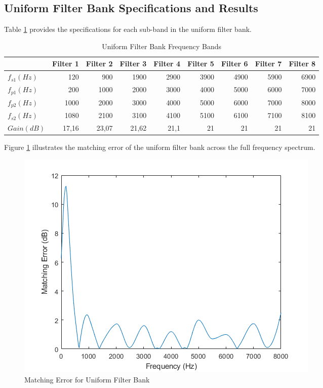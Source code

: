 \documentclass[11pt,onecolumn]{witseiepaper}
\begin{document}
\begin{appendices}
\section{Uniform Filter Bank Specifications and Results}
\label{app:uniFreqBand}

\noindent Table \ref{tab:uniFiltSpec} provides the specifications for each sub-band in the uniform filter bank.

\begin{table}[htbp]
  \centering
  \caption{Uniform Filter Bank Frequency Bands}
  \begin{adjustbox}{width=0.9\linewidth}
    \begin{tabular}{|l|r|r|r|r|r|r|r|r|}
    \hline
          & \multicolumn{1}{l|}{\textbf{Filter 1}} & \multicolumn{1}{l|}{\textbf{Filter 2}} & \multicolumn{1}{l|}{\textbf{Filter 3}} & \multicolumn{1}{l|}{\textbf{Filter 4}} & \multicolumn{1}{l|}{\textbf{Filter 5}} & \multicolumn{1}{l|}{\textbf{Filter 6}} & \multicolumn{1}{l|}{\textbf{Filter 7}} & \multicolumn{1}{l|}{\textbf{Filter 8}} \\
    \hline
    \textbf{$f_{s1} (Hz)$} & 120   & 900   & 1900  & 2900  & 3900  & 4900  & 5900  & 6900 \\
    \hline
    \textbf{$f_{p1} (Hz)$} & 200   & 1000  & 2000  & 3000  & 4000  & 5000  & 6000  & 7000 \\
    \hline
    \textbf{$f_{p2} (Hz)$} & 1000  & 2000  & 3000  & 4000  & 5000  & 6000  & 7000  & 8000 \\
    \hline
    \textbf{$f_{s2} (Hz)$} & 1080  & 2100  & 3100  & 4100  & 5100  & 6100  & 7100  & 8100 \\
    \hline
    \textbf{$Gain (dB)$} & 17,16 & 23,07 & 21,62 & 21,1  & 21    & 21    & 21    & 21 \\
    \hline
    \end{tabular}%
    \end{adjustbox}
  \label{tab:uniFiltSpec}%
\end{table}%

\noindent Figure \ref{fig:uniMatErr} illustrates the matching error of the uniform filter bank across the full frequency spectrum.

\begin{figure}[h]
\centering
\includegraphics[width=0.6\linewidth]{uniMatErr.PNG}
\caption{Matching Error for Uniform Filter Bank}
\label{fig:uniMatErr}
\end{figure}  


\end{appendices}
\end{document}
